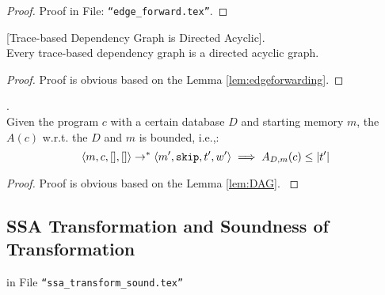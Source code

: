 %
\begin{proof}
Proof in File: {\tt ``edge\_forward.tex''}.
% 
\end{proof}
%
%
%
\begin{lem}
\label{lem:DAG}
[Trace-based Dependency Graph is Directed Acyclic].
\\
%
{
Every trace-based dependency graph is a directed acyclic graph.
}
\end{lem}
%
{
\begin{proof}
Proof is obvious based on the Lemma \ref{lem:edgeforwarding}.
\end{proof}
}
%
\begin{lem}
.
\\
{
Given the program $c$ with a certain database $D$ and starting memory $m$, the $A(c)$ w.r.t. the $D$ and $m$ is bounded, i.e.,:
%
\[
\langle m, c, [], [] \rangle 
\rightarrow^{*} 
\langle m', \mathtt{skip}, t', w' \rangle 
\implies
A_{D, m}(c) \leq |t'|
\]
}
\end{lem}
%
\begin{proof}
{
Proof is obvious based on the Lemma \ref{lem:DAG}.
}
\end{proof}
%
%
\clearpage
%
%
\subsection{SSA Transformation and Soundness of Transformation}
in File {\tt ``ssa\_transform\_sound.tex''}
% 
%
\clearpage